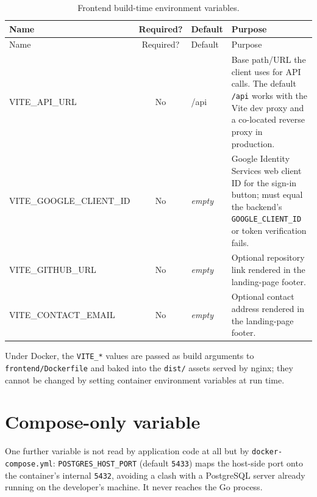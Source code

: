 \begin{center}
\begin{xltabular}{\linewidth}{>{\ttfamily\small}p{4.6cm} c >{\ttfamily\footnotesize}p{2.2cm} X}
  \caption{Frontend build-time environment variables.}\label{tab:ap-c-frontend}\\
  \toprule
  \normalfont Name & \normalfont Required? & \normalfont Default & \normalfont Purpose \\
  \midrule
  \endfirsthead
  \toprule
  \normalfont Name & \normalfont Required? & \normalfont Default & \normalfont Purpose \\
  \midrule
  \endhead
  \bottomrule
  \endlastfoot

  VITE\_API\_URL & No & /api &
  Base path/URL the client uses for API calls. The default \texttt{/api} works with the Vite dev proxy and a co-located reverse proxy in production. \\

  VITE\_GOOGLE\_CLIENT\_ID & No & \normalfont\itshape empty &
  Google Identity Services web client ID for the sign-in button; must equal the backend's \texttt{GOOGLE\_CLIENT\_ID} or token verification fails. \\

  VITE\_GITHUB\_URL & No & \normalfont\itshape empty &
  Optional repository link rendered in the landing-page footer. \\

  VITE\_CONTACT\_EMAIL & No & \normalfont\itshape empty &
  Optional contact address rendered in the landing-page footer. \\
\end{xltabular}
\end{center}

Under Docker, the \texttt{VITE\_*} values are passed as build arguments to \texttt{frontend/Dockerfile} and baked into the \texttt{dist/} assets served by nginx; they cannot be changed by setting container environment variables at run time.

\section{Compose-only variable}

One further variable is not read by application code at all but by \texttt{docker-compose.yml}: \texttt{POSTGRES\_HOST\_PORT} (default \texttt{5433}) maps the host-side port onto the container's internal \texttt{5432}, avoiding a clash with a PostgreSQL server already running on the developer's machine. It never reaches the Go process.

